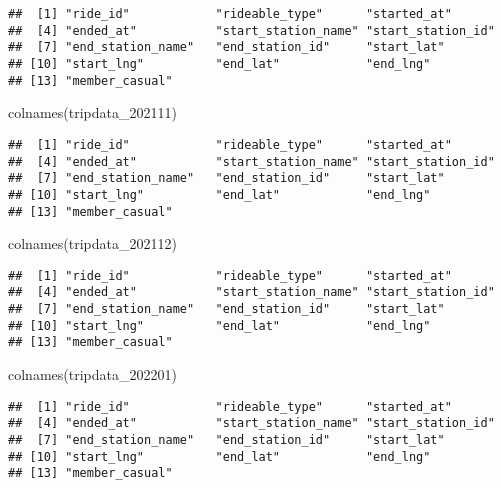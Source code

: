 \documentclass[
]{article}
\newenvironment{Shaded}{\begin{snugshade}}{\end{snugshade}}
\newcommand{\FunctionTok}[1]{\textcolor[rgb]{0.00,0.00,0.00}{#1}}
\newcommand{\NormalTok}[1]{#1}
\begin{document}
\begin{verbatim}
##  [1] "ride_id"            "rideable_type"      "started_at"        
##  [4] "ended_at"           "start_station_name" "start_station_id"  
##  [7] "end_station_name"   "end_station_id"     "start_lat"         
## [10] "start_lng"          "end_lat"            "end_lng"           
## [13] "member_casual"
\end{verbatim}

\begin{Shaded}
\begin{Highlighting}[]
\FunctionTok{colnames}\NormalTok{(tripdata\_202111)}
\end{Highlighting}
\end{Shaded}

\begin{verbatim}
##  [1] "ride_id"            "rideable_type"      "started_at"        
##  [4] "ended_at"           "start_station_name" "start_station_id"  
##  [7] "end_station_name"   "end_station_id"     "start_lat"         
## [10] "start_lng"          "end_lat"            "end_lng"           
## [13] "member_casual"
\end{verbatim}

\begin{Shaded}
\begin{Highlighting}[]
\FunctionTok{colnames}\NormalTok{(tripdata\_202112)}
\end{Highlighting}
\end{Shaded}

\begin{verbatim}
##  [1] "ride_id"            "rideable_type"      "started_at"        
##  [4] "ended_at"           "start_station_name" "start_station_id"  
##  [7] "end_station_name"   "end_station_id"     "start_lat"         
## [10] "start_lng"          "end_lat"            "end_lng"           
## [13] "member_casual"
\end{verbatim}

\begin{Shaded}
\begin{Highlighting}[]
\FunctionTok{colnames}\NormalTok{(tripdata\_202201)}
\end{Highlighting}
\end{Shaded}

\begin{verbatim}
##  [1] "ride_id"            "rideable_type"      "started_at"        
##  [4] "ended_at"           "start_station_name" "start_station_id"  
##  [7] "end_station_name"   "end_station_id"     "start_lat"         
## [10] "start_lng"          "end_lat"            "end_lng"           
## [13] "member_casual"
\end{verbatim}
\end{document}

